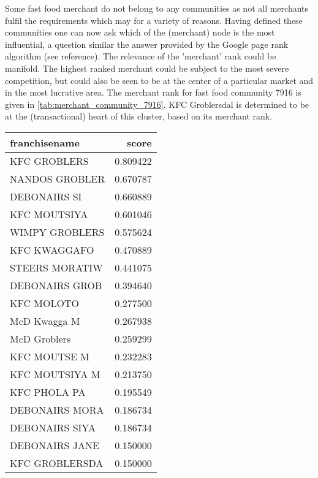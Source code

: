 Some fast food merchant do not belong to any communities as not all merchants fulfil the requirements which may for a variety of reasons.
Having defined these communities one can now ask which of the (merchant) node is the most influential, a question similar the answer provided by the Google page rank algorithm (see reference).  The relevance of the 'merchant' rank could be manifold.  The highest ranked merchant could be subject to the most severe competition, but could also be seen to be at the center of a particular market and in the most lucrative area.  The merchant rank for fast food community 7916  is given in \ref{tab:merchant_community_7916}.  KFC Groblersdal is determined to be at the (transactional) heart of this cluster, based on its merchant rank.

\begin{center}
    \begin{table}[]
        \centering
            \begin{tabular}{lr}
            \toprule
               franchisename &     score \\
            \midrule
                KFC GROBLERS &  0.809422 \\
              NANDOS GROBLER &  0.670787 \\
                DEBONAIRS SI &  0.660889 \\
                KFC MOUTSIYA &  0.601046 \\
              WIMPY GROBLERS &  0.575624 \\
                KFC KWAGGAFO &  0.470889 \\
              STEERS MORATIW &  0.441075 \\
              DEBONAIRS GROB &  0.394640 \\
                  KFC MOLOTO &  0.277500 \\
                McD Kwagga M &  0.267938 \\
                McD Groblers &  0.259299 \\
                KFC MOUTSE M &  0.232283 \\
              KFC MOUTSIYA M &  0.213750 \\
                KFC PHOLA PA &  0.195549 \\
              DEBONAIRS MORA &  0.186734 \\
              DEBONAIRS SIYA &  0.186734 \\
              DEBONAIRS JANE &  0.150000 \\
              KFC GROBLERSDA &  0.150000 \\

\end{tabular}
\end{table}
\end{center}
